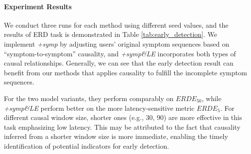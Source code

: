 \paragraph{Experiment Results} 
We conduct three runs for each method using different seed values, and the results of ERD task is demonstrated in Table \ref{tab:early_detection}. We implement \textit{+symp} by adjusting users' original symptom sequences based on ``symptom-to-symptom'' causality, and \textit{+symp\&LE} incorporates both types of causal relationships.
Generally, we can see that the early detection result can benefit from our methods that applies causality to fulfill the incomplete symptom sequences. 

For the two model variants, they perform comparably on $ERDE_{50}$, while \textit{+symp\&LE} perform better on the more latency-sensitive metric $ERDE_{5}$.
For different causal window size, shorter ones (e.g., 30, 90) are more effective in this task emphasizing low latency. This may be attributed to the fact that causality inferred from a shorter window size is more immediate, enabling the timely identification of potential indicators for early detection. 



